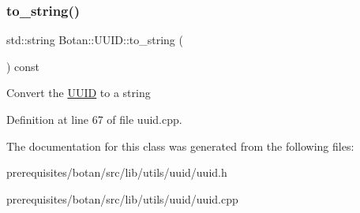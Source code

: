 \subsubsection{\texorpdfstring{to\+\_\+string()}{to\_string()}}
{\footnotesize\ttfamily std\+::string Botan\+::\+U\+U\+I\+D\+::to\+\_\+string (\begin{DoxyParamCaption}{ }\end{DoxyParamCaption}) const}

Convert the \mbox{\hyperlink{class_botan_1_1_u_u_i_d}{U\+U\+ID}} to a string 

Definition at line 67 of file uuid.\+cpp.



The documentation for this class was generated from the following files\+:\begin{DoxyCompactItemize}
\item 
prerequisites/botan/src/lib/utils/uuid/uuid.\+h\item 
prerequisites/botan/src/lib/utils/uuid/uuid.\+cpp\end{DoxyCompactItemize}
